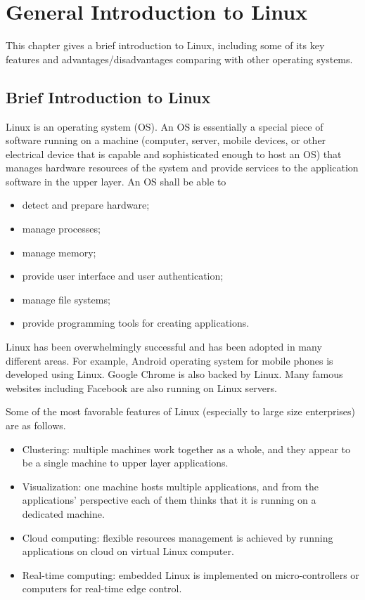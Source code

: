 \chapter{General Introduction to Linux}

This chapter gives a brief introduction to Linux, including some of its key features and advantages/disadvantages comparing with other operating systems.

\section{Brief Introduction to Linux}

Linux is an operating system (OS). An OS is essentially a special piece of software running on a machine (computer, server, mobile devices, or other electrical device that is capable and sophisticated enough to host an OS) that manages hardware resources of the system and provide services to the application software in the upper layer. An OS shall be able to
\begin{itemize}
  \item detect and prepare hardware;
  \item manage processes;
  \item manage memory;
  \item provide user interface and user authentication;
  \item manage file systems;
  \item provide programming tools for creating applications.
\end{itemize}

Linux has been overwhelmingly successful and has been adopted in many different areas. For example, Android operating system for mobile phones is developed using Linux. Google Chrome is also backed by Linux. Many famous websites including Facebook are also running on Linux servers.

Some of the most favorable features of Linux (especially to large size enterprises) are as follows.
\begin{itemize}
  \item Clustering: multiple machines work together as a whole, and they appear to be a single machine to upper layer applications.
  \item Visualization: one machine hosts multiple applications, and from the applications' perspective each of them thinks that it is running on a dedicated machine.
  \item Cloud computing: flexible resources management is achieved by running applications on cloud on virtual Linux computer.
  \item Real-time computing: embedded Linux is implemented on micro-controllers or computers for real-time edge control.
\end{itemize}

